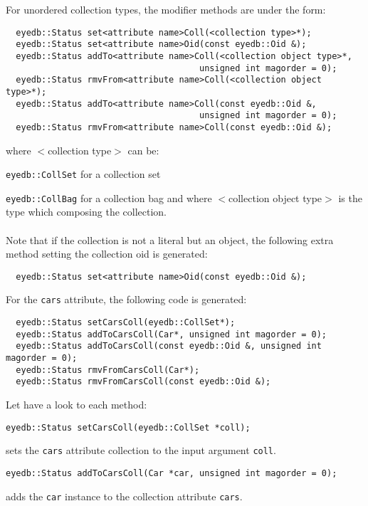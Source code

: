For unordered collection types, the modifier methods are under the form:
\verbsize
\begin{verbatim}
  eyedb::Status set<attribute name>Coll(<collection type>*);
  eyedb::Status set<attribute name>Oid(const eyedb::Oid &);
  eyedb::Status addTo<attribute name>Coll(<collection object type>*,
                                      unsigned int magorder = 0);
  eyedb::Status rmvFrom<attribute name>Coll(<collection object type>*);
  eyedb::Status addTo<attribute name>Coll(const eyedb::Oid &,
                                      unsigned int magorder = 0);
  eyedb::Status rmvFrom<attribute name>Coll(const eyedb::Oid &);
\end{verbatim}
\normalsize
where $<$collection type$>$ can be:
\be
\item \texttt{eyedb::CollSet} for a collection set
\item \texttt{eyedb::CollBag} for a collection bag
\ee
and where $<$collection object type$>$ is the type which composing
the collection.
\\
\\
Note that if the collection is not a literal but an object, the following
extra method setting the collection oid is generated:
\verbsize
\begin{verbatim}
  eyedb::Status set<attribute name>Oid(const eyedb::Oid &);
\end{verbatim}
\normalsize
For the \texttt{cars} attribute, the following code is generated:
\verbsize
\begin{verbatim}
  eyedb::Status setCarsColl(eyedb::CollSet*);
  eyedb::Status addToCarsColl(Car*, unsigned int magorder = 0);
  eyedb::Status addToCarsColl(const eyedb::Oid &, unsigned int magorder = 0);
  eyedb::Status rmvFromCarsColl(Car*);
  eyedb::Status rmvFromCarsColl(const eyedb::Oid &);
\end{verbatim}
\normalsize
Let have a look to each method:
\be
\item
\verbsize
\begin{verbatim}
eyedb::Status setCarsColl(eyedb::CollSet *coll);
\end{verbatim}
\normalsize
sets the \texttt{cars} attribute collection to the input argument
\texttt{coll}.
\item
\verbsize
\begin{verbatim}
eyedb::Status addToCarsColl(Car *car, unsigned int magorder = 0);
\end{verbatim}
\normalsize
adds the \texttt{car} instance to the collection attribute \texttt{cars}.
